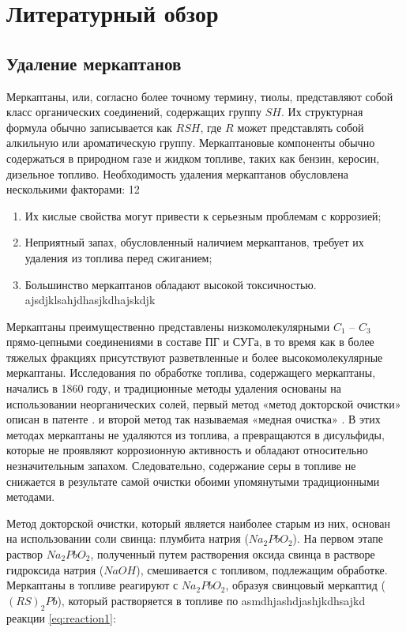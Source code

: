 \chapter{Литературный обзор} \label{ch:ch1}

\section{Удаление меркаптанов} \label{sec:ch1/sec1}

Меркаптаны, или, согласно более точному термину, тиолы, представляют собой класс органических соединений, содержащих группу $SH$. Их структурная формула обычно записывается как $RSH$, где $R$ может представлять собой алкильную или ароматическую группу. Меркаптановые компоненты обычно содержаться в природном газе и жидком топливе, таких как бензин, керосин, дизельное топливо. Необходимость удаления меркаптанов обусловлена несколькими факторами: 12
	
\begin{enumerate}
	\item Их кислые свойства могут привести к серьезным проблемам с коррозией;
	\item Неприятный запах, обусловленный наличием меркаптанов, требует их удаления из топлива перед сжиганием;
	\item Большинство меркаптанов обладают высокой токсичностью. ajsdjklsahjdhasjkdhajskdjk
\end{enumerate}

Меркаптаны преимущественно представлены низкомолекулярными $C _1$ – $C _3$ прямо-цепными соединениями в составе ПГ и СУГа, в то время как в более тяжелых фракциях присутствуют разветвленные и более высокомолекулярные меркаптаны. Исследования по обработке топлива, содержащего меркаптаны, начались в 1860 году, и традиционные методы удаления основаны на использовании неорганических солей, первый метод «метод докторской очистки» описан в патенте \cite{kalinowski_doctor_1959}. и второй метод так называемая «медная очистка» \cite{krause_color_1952}. В этих методах меркаптаны не удаляются из топлива, а превращаются в дисульфиды, которые не проявляют коррозионную активность и обладают относительно незначительным запахом. Следовательно, содержание серы в топливе не снижается в результате самой очистки обоими упомянутыми традиционными методами.

Метод докторской очистки, который является наиболее старым из них, основан на использовании соли свинца: плумбита натрия ($Na_2PbO_2$). На первом этапе раствор $Na_2PbO_2$, полученный путем растворения оксида свинца в растворе гидроксида натрия ($NaOH$), смешивается с топливом, подлежащим обработке. Меркаптаны в топливе реагируют с $Na_2PbO_2$, образуя свинцовый меркаптид ($(RS)_2Pb$), который растворяется в топливе по asmdhjashdjashjkdhsajkd реакции \cref{eq:reaction1}:

